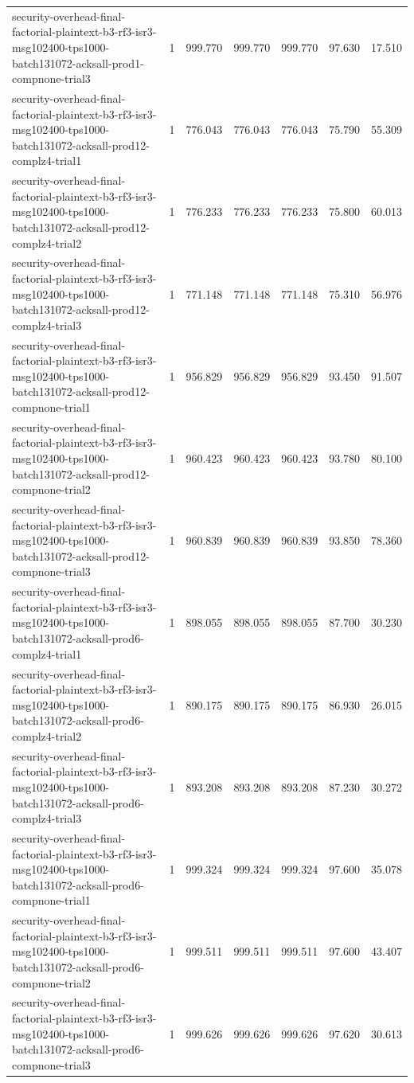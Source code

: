 \begin{tabular}{lrrrrrr}
security-overhead-final-factorial-plaintext-b3-rf3-isr3-msg102400-tps1000-batch131072-acksall-prod1-compnone-trial3 & 1 & 999.770 & 999.770 & 999.770 & 97.630 & 17.510 \\
security-overhead-final-factorial-plaintext-b3-rf3-isr3-msg102400-tps1000-batch131072-acksall-prod12-complz4-trial1 & 1 & 776.043 & 776.043 & 776.043 & 75.790 & 55.309 \\
security-overhead-final-factorial-plaintext-b3-rf3-isr3-msg102400-tps1000-batch131072-acksall-prod12-complz4-trial2 & 1 & 776.233 & 776.233 & 776.233 & 75.800 & 60.013 \\
security-overhead-final-factorial-plaintext-b3-rf3-isr3-msg102400-tps1000-batch131072-acksall-prod12-complz4-trial3 & 1 & 771.148 & 771.148 & 771.148 & 75.310 & 56.976 \\
security-overhead-final-factorial-plaintext-b3-rf3-isr3-msg102400-tps1000-batch131072-acksall-prod12-compnone-trial1 & 1 & 956.829 & 956.829 & 956.829 & 93.450 & 91.507 \\
security-overhead-final-factorial-plaintext-b3-rf3-isr3-msg102400-tps1000-batch131072-acksall-prod12-compnone-trial2 & 1 & 960.423 & 960.423 & 960.423 & 93.780 & 80.100 \\
security-overhead-final-factorial-plaintext-b3-rf3-isr3-msg102400-tps1000-batch131072-acksall-prod12-compnone-trial3 & 1 & 960.839 & 960.839 & 960.839 & 93.850 & 78.360 \\
security-overhead-final-factorial-plaintext-b3-rf3-isr3-msg102400-tps1000-batch131072-acksall-prod6-complz4-trial1 & 1 & 898.055 & 898.055 & 898.055 & 87.700 & 30.230 \\
security-overhead-final-factorial-plaintext-b3-rf3-isr3-msg102400-tps1000-batch131072-acksall-prod6-complz4-trial2 & 1 & 890.175 & 890.175 & 890.175 & 86.930 & 26.015 \\
security-overhead-final-factorial-plaintext-b3-rf3-isr3-msg102400-tps1000-batch131072-acksall-prod6-complz4-trial3 & 1 & 893.208 & 893.208 & 893.208 & 87.230 & 30.272 \\
security-overhead-final-factorial-plaintext-b3-rf3-isr3-msg102400-tps1000-batch131072-acksall-prod6-compnone-trial1 & 1 & 999.324 & 999.324 & 999.324 & 97.600 & 35.078 \\
security-overhead-final-factorial-plaintext-b3-rf3-isr3-msg102400-tps1000-batch131072-acksall-prod6-compnone-trial2 & 1 & 999.511 & 999.511 & 999.511 & 97.600 & 43.407 \\
security-overhead-final-factorial-plaintext-b3-rf3-isr3-msg102400-tps1000-batch131072-acksall-prod6-compnone-trial3 & 1 & 999.626 & 999.626 & 999.626 & 97.620 & 30.613 \\

\end{tabular}
